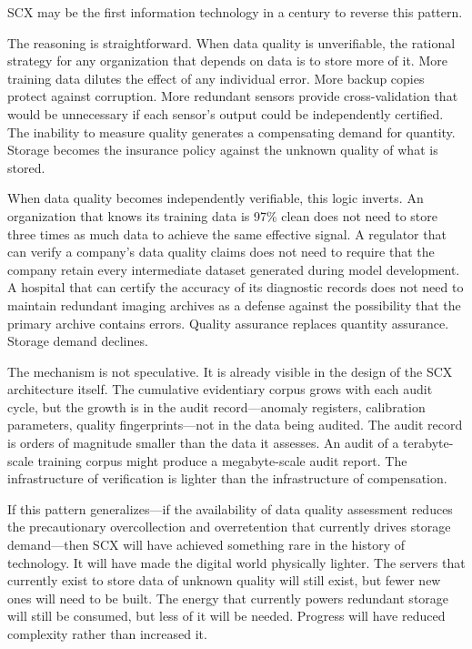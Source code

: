 \documentclass[12pt,a4paper]{article}
\begin{document}
SCX may be the first information technology in a century to reverse this pattern.

The reasoning is straightforward. When data quality is unverifiable, the rational strategy for any organization that depends on data is to store more of it. More training data dilutes the effect of any individual error. More backup copies protect against corruption. More redundant sensors provide cross-validation that would be unnecessary if each sensor's output could be independently certified. The inability to measure quality generates a compensating demand for quantity. Storage becomes the insurance policy against the unknown quality of what is stored.

When data quality becomes independently verifiable, this logic inverts. An organization that knows its training data is 97\% clean does not need to store three times as much data to achieve the same effective signal. A regulator that can verify a company's data quality claims does not need to require that the company retain every intermediate dataset generated during model development. A hospital that can certify the accuracy of its diagnostic records does not need to maintain redundant imaging archives as a defense against the possibility that the primary archive contains errors. Quality assurance replaces quantity assurance. Storage demand declines.

The mechanism is not speculative. It is already visible in the design of the SCX architecture itself. The cumulative evidentiary corpus grows with each audit cycle, but the growth is in the audit record---anomaly registers, calibration parameters, quality fingerprints---not in the data being audited. The audit record is orders of magnitude smaller than the data it assesses. An audit of a terabyte-scale training corpus might produce a megabyte-scale audit report. The infrastructure of verification is lighter than the infrastructure of compensation.

If this pattern generalizes---if the availability of data quality assessment reduces the precautionary overcollection and overretention that currently drives storage demand---then SCX will have achieved something rare in the history of technology. It will have made the digital world physically lighter. The servers that currently exist to store data of unknown quality will still exist, but fewer new ones will need to be built. The energy that currently powers redundant storage will still be consumed, but less of it will be needed. Progress will have reduced complexity rather than increased it.
\end{document}
